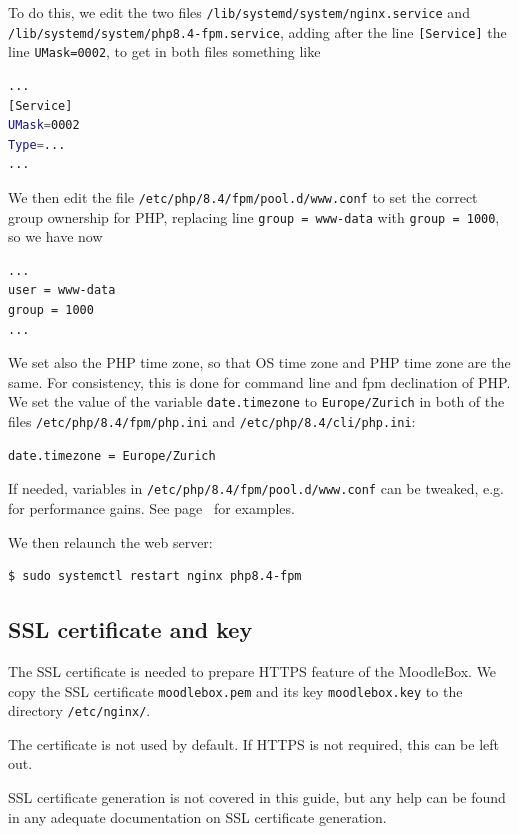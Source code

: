 \documentclass[12pt]{article}
\begin{document}
To do this, we edit the two files \lstinline{/lib/systemd/system/nginx.service} and \lstinline{/lib/systemd/system/php8.4-fpm.service}, adding after the line \lstinline{[Service]} the line \lstinline{UMask=0002}, to get in both files something like
\begin{lstlisting}[language=bash]
...
[Service]
UMask=0002
Type=...
...
\end{lstlisting}
We then edit the file \lstinline{/etc/php/8.4/fpm/pool.d/www.conf} to set the correct group ownership for PHP, replacing line \lstinline{group = www-data} with \lstinline{group = 1000}, so we have now
\begin{lstlisting}[language=bash]
...
user = www-data
group = 1000
...
\end{lstlisting}
We set also the PHP time zone, so that OS time zone and PHP time zone are the same.
For consistency, this is done for command line and fpm declination of PHP.
We set the value of the variable \lstinline{date.timezone} to \lstinline{Europe/Zurich} in both of the files \lstinline{/etc/php/8.4/fpm/php.ini} and \lstinline{/etc/php/8.4/cli/php.ini}:
\begin{lstlisting}[language=bash]
date.timezone = Europe/Zurich
\end{lstlisting}

If needed, variables in \lstinline{/etc/php/8.4/fpm/pool.d/www.conf} can be tweaked, e.g. for performance gains. See page~\pageref{ssec-php-optimization} for examples.

We then relaunch the web server:
\begin{lstlisting}[language=bash]
$ sudo systemctl restart nginx php8.4-fpm
\end{lstlisting}

\subsection{SSL certificate and key}

The SSL certificate is needed to prepare HTTPS feature of the MoodleBox.
We copy the SSL certificate \lstinline{moodlebox.pem} and its key \lstinline{moodlebox.key} to the directory \lstinline{/etc/nginx/}.

The certificate is not used by default.
If HTTPS is not required, this can be left out.

SSL certificate generation is not covered in this guide, but any help can be
found in any adequate documentation on SSL certificate generation.
\end{document}
